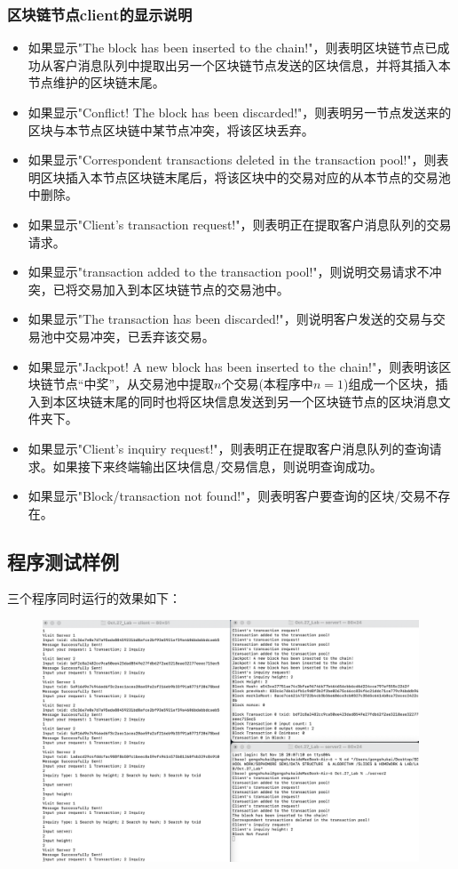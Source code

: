 \documentclass[10pt,a4paper]{article}
\begin{document}
    \subsubsection{区块链节点client的显示说明}
    \begin{itemize}
        \item 如果显示"The block has been inserted to the chain!"，则表明区块链节点已成功从客户消息队列中提取出另一个区块链节点发送的区块信息，并将其插入本节点维护的区块链末尾。
        \item 如果显示"Conflict! The block has been discarded!"，则表明另一节点发送来的区块与本节点区块链中某节点冲突，将该区块丢弃。
        \item 如果显示"Correspondent transactions deleted in the transaction pool!"，则表明区块插入本节点区块链末尾后，将该区块中的交易对应的从本节点的交易池中删除。
        \item 如果显示"Client's transaction request!"，则表明正在提取客户消息队列的交易请求。 
        \item 如果显示"transaction added to the transaction pool!"，则说明交易请求不冲突，已将交易加入到本区块链节点的交易池中。
        \item 如果显示"The transaction has been discarded!"，则说明客户发送的交易与交易池中交易冲突，已丢弃该交易。
        \item 如果显示"Jackpot! A new block has been inserted to the chain!"，则表明该区块链节点“中奖”，从交易池中提取$n$个交易(本程序中$n=1$)组成一个区块，插入到本区块链末尾的同时也将区块信息发送到另一个区块链节点的区块消息文件夹下。
        \item 如果显示"Client's inquiry request!"，则表明正在提取客户消息队列的查询请求。如果接下来终端输出区块信息/交易信息，则说明查询成功。
        \item 如果显示"Block/transaction not found!"，则表明客户要查询的区块/交易不存在。
    \end{itemize}
    \subsection{程序测试样例}
    三个程序同时运行的效果如下：
    \begin{figure}[H]
        \centering
            \includegraphics[scale = 0.4]{screenshot.png}
    \end{figure}
\newpage
\end{document}
